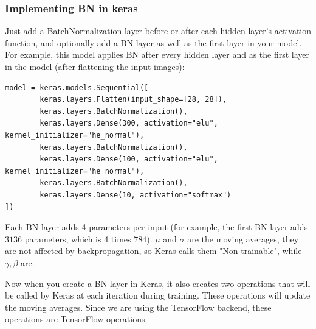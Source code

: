 \documentclass[12pt, letterpaper]{article}
\theoremstyle{definition}
\begin{document}
\subsubsection{Implementing BN in keras}
Just add a BatchNormalization layer before or after each hidden layer's activation function, and optionally add a BN layer as well as the first layer in your model. For example, this model applies BN after every hidden layer and as the first layer in the model (after flattening the input images):
\begin{lstlisting}
model = keras.models.Sequential([
        keras.layers.Flatten(input_shape=[28, 28]),
        keras.layers.BatchNormalization(),
        keras.layers.Dense(300, activation="elu", kernel_initializer="he_normal"),
        keras.layers.BatchNormalization(),
        keras.layers.Dense(100, activation="elu", kernel_initializer="he_normal"),
        keras.layers.BatchNormalization(),
        keras.layers.Dense(10, activation="softmax")
])
\end{lstlisting}
Each BN layer adds 4 parameters per input (for example, the first BN layer adds $3136$ parameters, which is 4 times $784$). $\mu$ and $\sigma$ are the moving averages, they are not affected by backpropagation, so Keras calls them "Non-trainable", while $\gamma, \beta$ are.

Now when you create a BN layer in Keras, it also creates two operations that will be called by Keras at each iteration during training. These operations will update the moving averages. Since we are using the TensorFlow backend, these operations are TensorFlow operations.
\end{document}
